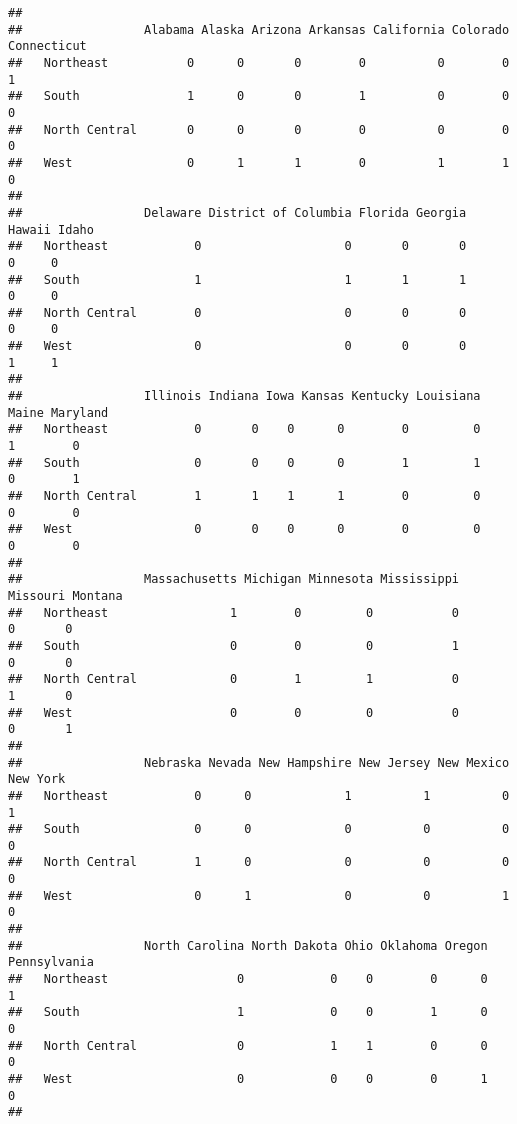 \documentclass[
]{article}
\begin{document}
\begin{verbatim}
##                
##                 Alabama Alaska Arizona Arkansas California Colorado Connecticut
##   Northeast           0      0       0        0          0        0           1
##   South               1      0       0        1          0        0           0
##   North Central       0      0       0        0          0        0           0
##   West                0      1       1        0          1        1           0
##                
##                 Delaware District of Columbia Florida Georgia Hawaii Idaho
##   Northeast            0                    0       0       0      0     0
##   South                1                    1       1       1      0     0
##   North Central        0                    0       0       0      0     0
##   West                 0                    0       0       0      1     1
##                
##                 Illinois Indiana Iowa Kansas Kentucky Louisiana Maine Maryland
##   Northeast            0       0    0      0        0         0     1        0
##   South                0       0    0      0        1         1     0        1
##   North Central        1       1    1      1        0         0     0        0
##   West                 0       0    0      0        0         0     0        0
##                
##                 Massachusetts Michigan Minnesota Mississippi Missouri Montana
##   Northeast                 1        0         0           0        0       0
##   South                     0        0         0           1        0       0
##   North Central             0        1         1           0        1       0
##   West                      0        0         0           0        0       1
##                
##                 Nebraska Nevada New Hampshire New Jersey New Mexico New York
##   Northeast            0      0             1          1          0        1
##   South                0      0             0          0          0        0
##   North Central        1      0             0          0          0        0
##   West                 0      1             0          0          1        0
##                
##                 North Carolina North Dakota Ohio Oklahoma Oregon Pennsylvania
##   Northeast                  0            0    0        0      0            1
##   South                      1            0    0        1      0            0
##   North Central              0            1    1        0      0            0
##   West                       0            0    0        0      1            0
##                

\end{verbatim}
\end{document}
